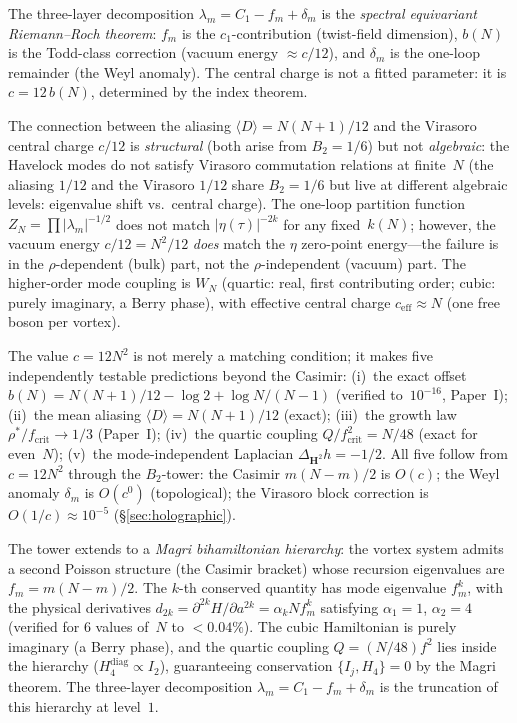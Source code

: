 \noindent
The three-layer decomposition
$\lambda_m = C_1 - f_m + \delta_m$
is the \emph{spectral equivariant Riemann--Roch theorem}:
$f_m$ is the $c_1$-contribution (twist-field dimension),
$b(N)$ is the Todd-class correction (vacuum energy $\approx c/12$),
and $\delta_m$ is the one-loop remainder (the Weyl anomaly).
The central charge is not a fitted parameter: it is $c = 12\,b(N)$,
determined by the index theorem.

\begin{remark}
\label{rmk:honest-negatives}
The connection between the aliasing $\langle D\rangle = N(N{+}1)/12$ and
the Virasoro central charge $c/12$ is \emph{structural} (both arise
from $B_2 = 1/6$) but not \emph{algebraic}: the Havelock modes do
not satisfy Virasoro commutation relations at finite~$N$
(the aliasing $1/12$ and the Virasoro $1/12$ share $B_2 = 1/6$
but live at different algebraic levels: eigenvalue shift vs.\
central charge).
The one-loop partition function $Z_N = \prod|\lambda_m|^{-1/2}$
does not match $|\eta(\tau)|^{-2k}$ for any fixed~$k(N)$; however,
the vacuum energy $c/12 = N^2/12$ \emph{does} match the
$\eta$ zero-point energy---the failure is in the
$\rho$-dependent (bulk) part, not the $\rho$-independent
(vacuum) part.
The higher-order mode coupling is $W_N$ (quartic: real, first
contributing order; cubic: purely imaginary, a Berry phase), with
effective central charge $c_{\mathrm{eff}} \approx N$ (one free boson
per vortex).
\end{remark}

\noindent
The value $c = 12N^2$ is not merely a matching condition; it
makes five independently testable predictions beyond the Casimir:
(i)~the exact offset $b(N) = N(N{+}1)/12 - \log 2 + \log N/(N{-}1)$
(verified to~$10^{-16}$, Paper~I);
(ii)~the mean aliasing $\langle D\rangle = N(N{+}1)/12$ (exact);
(iii)~the growth law $\rho^*/f_{\mathrm{crit}} \to 1/3$ (Paper~I);
(iv)~the quartic coupling $Q/f_{\mathrm{crit}}^2 = N/48$ (exact for even~$N$);
(v)~the mode-independent Laplacian $\Delta_{\mathbf{H}^2} h = -1/2$.
All five follow from $c = 12N^2$ through the $B_2$-tower:
the Casimir $m(N{-}m)/2$ is $O(c)$; the Weyl anomaly $\delta_m$
is $O(c^0)$ (topological); the Virasoro block correction is
$O(1/c) \approx 10^{-5}$ (\S\ref{sec:holographic}).

The tower extends to a \emph{Magri bihamiltonian hierarchy}:
the vortex system admits a second Poisson structure (the Casimir
bracket) whose recursion eigenvalues are $f_m = m(N{-}m)/2$.
The $k$-th conserved quantity has mode eigenvalue $f_m^k$,
with the physical derivatives
$d_{2k} = \partial^{2k}H/\partial a^{2k} = \alpha_k N f_m^k$
satisfying $\alpha_1 = 1$, $\alpha_2 = 4$
(verified for $6$ values of~$N$ to $< 0.04\%$).
The cubic Hamiltonian is purely imaginary (a Berry phase),
and the quartic coupling $Q = (N/48)f^2$ lies inside the hierarchy
($H_4^{\mathrm{diag}} \propto I_2$), guaranteeing conservation
$\{I_j, H_4\} = 0$ by the Magri theorem.
The three-layer decomposition $\lambda_m = C_1 - f_m + \delta_m$
is the truncation of this hierarchy at level~$1$.

